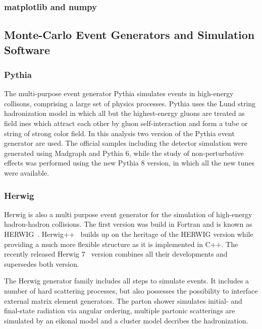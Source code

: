 \subsubsection{matplotlib and numpy}



\subsection{Monte-Carlo Event Generators and Simulation Software}
\label{subsection:mc_generators}

\subsubsection{Pythia}

The multi-purpose event generator Pythia simulates events in high-energy
collisons, comprising a large set of physics processes. Pythia uses the Lund
string hadronization model in which all but the highest-energy gluons are
treated as field ines which attract each other by gluon self-interaction and
form a tube or string of strong color field. In this analysis two version of the
Pythia event generator are used. The official samples including the detector
simulation were generated using Madgraph and Pythia 6, while the study of
non-perturbative effects was performed using the new Pythia 8 version, in which
all the new tunes were available. 

\subsubsection{Herwig}

Herwig is also a multi purpose event generator for the simulation of high-energy
hadron-hadron collisions. The first version was build in Fortran and is known as
HERWIG~\cite{Corcella:2000bw}. Herwig++~\cite{Bahr:2008pv} builds up on the
heritage of the HERWIG version while providing a much more flexible structure as
it is implemented in C++. The recently released Herwig 7~\cite{Bellm:2015jjp}
version combines all their developments and supersedes both version. 

The Herwig generator family includes all steps to simulate events. It includes a
number of hard scattering processes, but also possesses the possibility to
interface external matrix element generators. The parton shower simulates
initial- and final-state radiation via angular ordering, multiple partonic
scatterings are simulated by an eikonal model and a cluster model decribes the
hadronization. 

